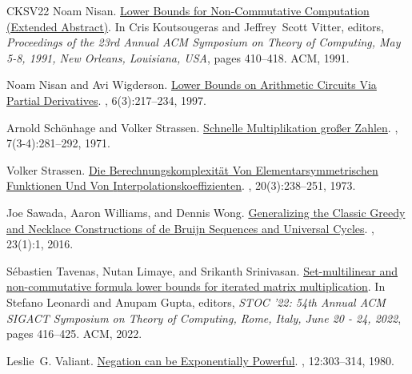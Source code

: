 \documentclass[10pt,a4paper]{article}
\begin{document}
\begin{thebibliography}{CKSV22}
Noam Nisan.
\newblock \href {http://dx.doi.org/10.1145/103418.103462} {Lower Bounds for
  Non-Commutative Computation (Extended Abstract)}.
\newblock In Cris Koutsougeras and Jeffrey~Scott Vitter, editors, {\em
  Proceedings of the 23rd Annual {ACM} Symposium on Theory of Computing, May
  5-8, 1991, New Orleans, Louisiana, {USA}}, pages 410--418. {ACM}, 1991.

Noam Nisan and Avi Wigderson.
\newblock \href {http://dx.doi.org/10.1007/BF01294256} {Lower Bounds on
  Arithmetic Circuits Via Partial Derivatives}.
, 6(3):217--234, 1997.

Arnold Sch{\"{o}}nhage and Volker Strassen.
\newblock \href {http://dx.doi.org/10.1007/BF02242355} {Schnelle Multiplikation
  gro{\ss}er Zahlen}.
, 7(3-4):281--292, 1971.

Volker Strassen.
\newblock \href {http://dx.doi.org/10.1007/BF01436566} {Die
  {B}erechnungskomplexit\"{a}t Von Elementarsymmetrischen {F}unktionen Und Von
  {I}nterpolationskoeffizienten}.
, 20(3):238--251, 1973.

Joe Sawada, Aaron Williams, and Dennis Wong.
\newblock \href {http://dx.doi.org/10.37236/5517} {Generalizing the Classic
  Greedy and Necklace Constructions of de Bruijn Sequences and Universal
  Cycles}.
, 23(1):1, 2016.

S{\'{e}}bastien Tavenas, Nutan Limaye, and Srikanth Srinivasan.
\newblock \href {http://dx.doi.org/10.1145/3519935.3520044} {Set-multilinear
  and non-commutative formula lower bounds for iterated matrix multiplication}.
\newblock In Stefano Leonardi and Anupam Gupta, editors, {\em {STOC} '22: 54th
  Annual {ACM} {SIGACT} Symposium on Theory of Computing, Rome, Italy, June 20
  - 24, 2022}, pages 416--425. {ACM}, 2022.

Leslie~G. Valiant.
\newblock \href {http://dx.doi.org/10.1016/0304-3975(80)90060-2} {Negation can
  be Exponentially Powerful}.
, 12:303--314, 1980.

\end{thebibliography}
\end{document}
